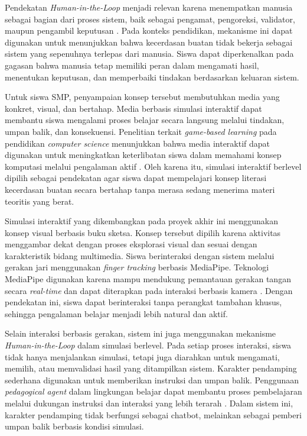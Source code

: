 \documentclass[12pt,a4paper,oneside,openany]{report}
\begin{document}
Pendekatan \textit{Human-in-the-Loop} menjadi relevan karena menempatkan manusia sebagai bagian dari proses sistem, baik sebagai pengamat, pengoreksi, validator, maupun pengambil keputusan \cite{ref4}. Pada konteks pendidikan, mekanisme ini dapat digunakan untuk menunjukkan bahwa kecerdasan buatan tidak bekerja sebagai sistem yang sepenuhnya terlepas dari manusia. Siswa dapat diperkenalkan pada gagasan bahwa manusia tetap memiliki peran dalam mengamati hasil, menentukan keputusan, dan memperbaiki tindakan berdasarkan keluaran sistem.

Untuk siswa SMP, penyampaian konsep tersebut membutuhkan media yang konkret, visual, dan bertahap. Media berbasis simulasi interaktif dapat membantu siswa mengalami proses belajar secara langsung melalui tindakan, umpan balik, dan konsekuensi. Penelitian terkait \textit{game-based learning} pada pendidikan \textit{computer science} menunjukkan bahwa media interaktif dapat digunakan untuk meningkatkan keterlibatan siswa dalam memahami konsep komputasi melalui pengalaman aktif \cite{ref6}. Oleh karena itu, simulasi interaktif berlevel dipilih sebagai pendekatan agar siswa dapat mempelajari konsep literasi kecerdasan buatan secara bertahap tanpa merasa sedang menerima materi teoritis yang berat.

Simulasi interaktif yang dikembangkan pada proyek akhir ini menggunakan konsep visual berbasis buku sketsa. Konsep tersebut dipilih karena aktivitas menggambar dekat dengan proses eksplorasi visual dan sesuai dengan karakteristik bidang multimedia. Siswa berinteraksi dengan sistem melalui gerakan jari menggunakan \textit{finger tracking} berbasis MediaPipe. Teknologi MediaPipe digunakan karena mampu mendukung pemantauan gerakan tangan secara \textit{real-time} dan dapat diterapkan pada interaksi berbasis kamera \cite{ref10}. Dengan pendekatan ini, siswa dapat berinteraksi tanpa perangkat tambahan khusus, sehingga pengalaman belajar menjadi lebih natural dan aktif.

Selain interaksi berbasis gerakan, sistem ini juga menggunakan mekanisme \textit{Human-in-the-Loop} dalam simulasi berlevel. Pada setiap proses interaksi, siswa tidak hanya menjalankan simulasi, tetapi juga diarahkan untuk mengamati, memilih, atau memvalidasi hasil yang ditampilkan sistem. Karakter pendamping sederhana digunakan untuk memberikan instruksi dan umpan balik. Penggunaan \textit{pedagogical agent} dalam lingkungan belajar dapat membantu proses pembelajaran melalui dukungan instruksi dan interaksi yang lebih terarah \cite{ref9}. Dalam sistem ini, karakter pendamping tidak berfungsi sebagai chatbot, melainkan sebagai pemberi umpan balik berbasis kondisi simulasi.
\end{document}
